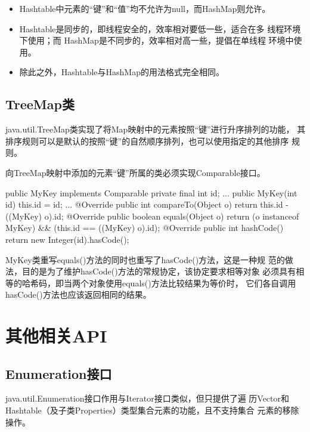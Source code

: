 \begin{itemize}
\item Hashtable中元素的“键”和“值”均不允许为null，而HashMap则允许。
\item {\Red Hashtable是同步的，即线程安全的，效率相对要低一些，适合在多
    线程环境下使用；而 HashMap是不同步的，效率相对高一些，提倡在单线程
    环境中使用。}
\item 除此之外，Hashtable与HashMap的用法格式完全相同。
\end{itemize}

\subsection{TreeMap类}

java.util.TreeMap类实现了将Map映射中的元素按照“键”进行升序排列的功能，
其排序规则可以是默认的按照“键”的自然顺序排列，也可以使用指定的其他排序
规则。

向TreeMap映射中添加的元素“键”所属的类必须实现Comparable接口。

\begin{javaCode}
  public MyKey implements Comparable {
    private final int id;
    ...
    public MyKey(int id) {
      this.id = id;
    }
    ...
    @Override
    public int compareTo(Object o) {
      return this.id - ((MyKey) o).id;
    }
    @Override
    public boolean equals(Object o) {
      return (o instanceof MyKey) && (this.id == ((MyKey) o).id);
    }
    @Override
    public int hashCode() {
      return new Integer(id).hasCode();
    }
  }  
\end{javaCode}


{\kai MyKey类重写equals()方法的同时也重写了hasCode()方法，这是一种规
  范的做法，目的是为了维护hasCode()方法的常规协定，该协定要求相等对象
  必须具有相等的哈希码，即当两个对象使用equals()方法比较结果为等价时，
  它们各自调用hasCode()方法也应该返回相同的结果。}

\section{其他相关API}

\subsection{Enumeration接口}

java.util.Enumeration接口作用与Iterator接口类似，但只提供了遍
历Vector和Hashtable（及子类Properties）类型集合元素的功能，且不支持集合
元素的移除操作。

